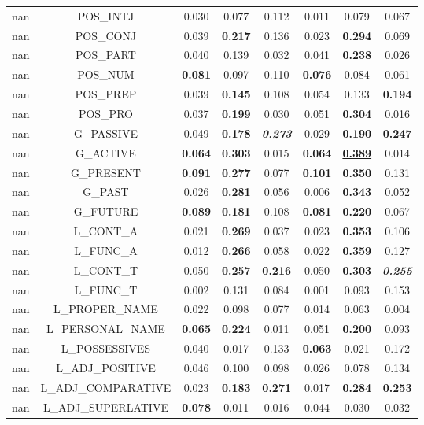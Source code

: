 \begin{table}[ht]
\begin{tabular}{lccccccc}
nan & POS_INTJ & 0.030 & 0.077 & 0.112 & 0.011 & 0.079 & 0.067 \\
nan & POS_CONJ & 0.039 & \textbf{0.217} & 0.136 & 0.023 & \textbf{0.294} & 0.069 \\
nan & POS_PART & 0.040 & 0.139 & 0.032 & 0.041 & \textbf{0.238} & 0.026 \\
nan & POS_NUM & \textbf{0.081} & 0.097 & 0.110 & \textbf{0.076} & 0.084 & 0.061 \\
nan & POS_PREP & 0.039 & \textbf{0.145} & 0.108 & 0.054 & 0.133 & \textbf{0.194} \\
nan & POS_PRO & 0.037 & \textbf{0.199} & 0.030 & 0.051 & \textbf{0.304} & 0.016 \\
nan & G_PASSIVE & 0.049 & \textbf{0.178} & \textit{\textbf{0.273}} & 0.029 & \textbf{0.190} & \textbf{0.247} \\
nan & G_ACTIVE & \textbf{0.064} & \textbf{0.303} & 0.015 & \textbf{0.064} & \textbf{\underline{\textbf{0.389}}} & 0.014 \\
nan & G_PRESENT & \textbf{0.091} & \textbf{0.277} & 0.077 & \textbf{0.101} & \textbf{0.350} & 0.131 \\
nan & G_PAST & 0.026 & \textbf{0.281} & 0.056 & 0.006 & \textbf{0.343} & 0.052 \\
nan & G_FUTURE & \textbf{0.089} & \textbf{0.181} & 0.108 & \textbf{0.081} & \textbf{0.220} & 0.067 \\
nan & L_CONT_A & 0.021 & \textbf{0.269} & 0.037 & 0.023 & \textbf{0.353} & 0.106 \\
nan & L_FUNC_A & 0.012 & \textbf{0.266} & 0.058 & 0.022 & \textbf{0.359} & 0.127 \\
nan & L_CONT_T & 0.050 & \textbf{0.257} & \textbf{0.216} & 0.050 & \textbf{0.303} & \textit{\textbf{0.255}} \\
nan & L_FUNC_T & 0.002 & 0.131 & 0.084 & 0.001 & 0.093 & 0.153 \\
nan & L_PROPER_NAME & 0.022 & 0.098 & 0.077 & 0.014 & 0.063 & 0.004 \\
nan & L_PERSONAL_NAME & \textbf{0.065} & \textbf{0.224} & 0.011 & 0.051 & \textbf{0.200} & 0.093 \\
nan & L_POSSESSIVES & 0.040 & 0.017 & 0.133 & \textbf{0.063} & 0.021 & 0.172 \\
nan & L_ADJ_POSITIVE & 0.046 & 0.100 & 0.098 & 0.026 & 0.078 & 0.134 \\
nan & L_ADJ_COMPARATIVE & 0.023 & \textbf{0.183} & \textbf{0.271} & 0.017 & \textbf{0.284} & \textbf{0.253} \\
nan & L_ADJ_SUPERLATIVE & \textbf{0.078} & 0.011 & 0.016 & 0.044 & 0.030 & 0.032 \\

\end{tabular}
\end{table}
